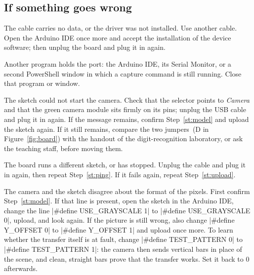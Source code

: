 \subsection{If something goes wrong}
\label{sec:t1trouble}

\cause The cable carries no data, or the driver was not installed.
\remedy Use another cable. Open the Arduino IDE once more and accept the installation of the
device software; then unplug the board and plug it in again.

\cause Another program holds the port: the Arduino IDE, its Serial Monitor, or a second
PowerShell window in which a capture command is still running.
\remedy Close that program or window.

\cause The sketch could not start the camera.
\remedy Check that the selector points to \emph{Camera} and that the green camera module sits
firmly on its pins; unplug the USB cable and plug it in again. If the message remains, confirm
Step~\ref{st:model} and upload the sketch again. If it still remains, compare the two
jumpers~(D in Figure~\ref{fig:board}) with the handout of the digit-recognition laboratory, or
ask the teaching staff, before moving them.

\cause The board runs a different sketch, or has stopped.
\remedy Unplug the cable and plug it in again, then repeat Step~\ref{st:ping}. If it fails
again, repeat Step~\ref{st:upload}.

\cause The camera and the sketch disagree about the format of the pixels.
\remedy First confirm Step~\ref{st:model}. If that line is present, open the sketch in the
Arduino IDE, change the line \code|#define USE_GRAYSCALE 1| to \code|#define USE_GRAYSCALE 0|,
upload, and look again. If the picture is still wrong, also change \code|#define Y_OFFSET 0|
to \code|#define Y_OFFSET 1| and upload once more. To learn whether the transfer itself is at
fault, change \code|#define TEST_PATTERN 0| to \code|#define TEST_PATTERN 1|: the camera then
sends vertical bars in place of the scene, and clean, straight bars prove that the transfer
works. Set it back to 0 afterwards.

